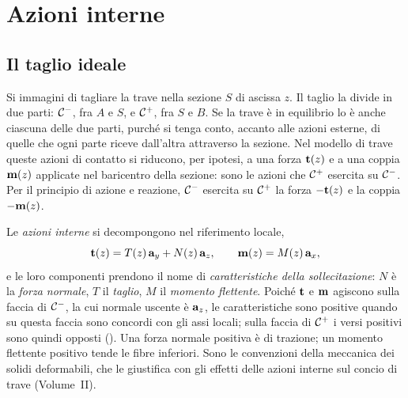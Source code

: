\section{Azioni interne}
\label{sec:caratteristiche}

\subsection{Il taglio ideale}
\label{sec:taglio_ideale}

Si immagini di tagliare la trave nella sezione $S$ di
ascissa $z$. Il taglio la
divide in due parti: $\mathcal{C}^-$, fra $A$ e $S$, e $\mathcal{C}^+$,
fra $S$ e $B$. Se la trave è in equilibrio lo è anche
ciascuna delle due parti, purché si tenga conto, accanto
alle azioni esterne, di quelle che ogni parte riceve
dall'altra attraverso la sezione. Nel modello di trave
queste azioni di contatto si riducono, per ipotesi, a
una forza $\mathbf{t}(z)$ e a una coppia $\mathbf{m}(z)$ applicate nel
baricentro della sezione: sono le azioni che $\mathcal{C}^+$
esercita su $\mathcal{C}^-$. Per il principio di azione e
reazione, $\mathcal{C}^-$ esercita su $\mathcal{C}^+$ la forza $-\mathbf{t}(z)$
e la coppia $-\mathbf{m}(z)$.

Le \emph{azioni interne}
si decompongono nel riferimento locale,
\begin{equation}\label{eq:azioni_interne}
	\mathbf{t}(z) = T(z)\,\mathbf{a}_y + N(z)\,\mathbf{a}_z, \qquad
	\mathbf{m}(z) = M(z)\,\mathbf{a}_x,
\end{equation}
e le loro componenti prendono il nome di
\emph{caratteristiche della sollecitazione}:
$N$ è la \emph{forza normale},
$T$ il \emph{taglio},
$M$ il \emph{momento flettente}.
Poiché $\mathbf{t}$ e $\mathbf{m}$ agiscono sulla faccia di $\mathcal{C}^-$,
la cui normale uscente è $\mathbf{a}_z$, le caratteristiche
sono positive quando su questa faccia sono concordi con
gli assi locali; sulla faccia di $\mathcal{C}^+$ i versi positivi
sono quindi opposti (). Una forza
normale positiva è di trazione; un momento flettente
positivo tende le fibre inferiori. Sono le convenzioni
della meccanica dei solidi deformabili, che le giustifica
con gli effetti delle azioni interne sul concio di trave
(Volume~II).

